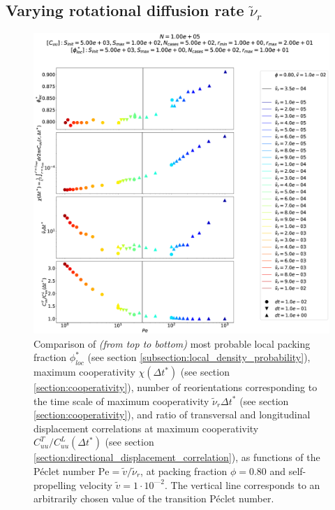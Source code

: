 \documentclass[class=report, float=false, crop=false]{standalone}
\begin{document}
\subsection{Varying rotational diffusion rate $\tilde{\nu}_r$}
\vfill
\begin{figure}[h!]
\centering
\includegraphics[width=\textwidth]{figures/figs/comparison_Dk8000_Vj1000_drdt.eps}
\caption{Comparison of \textit{(from top to bottom)} most probable local packing fraction $\phi_{loc}^*$ (see section \ref{subsection:local_density_probability}), maximum cooperativity $\chi(\Delta t^*)$ (see section \ref{section:cooperativity}), number of reorientations corresponding to the time scale of maximum cooperativity $\tilde{\nu}_r\Delta t^*$ (see section \ref{section:cooperativity}), and ratio of transversal and longitudinal displacement correlations at maximum cooperativity $C_{uu}^T/C_{uu}^L(\Delta t^*)$ (see section \ref{section:directional_displacement_correlation}), as functions of the P\'eclet number $\text{Pe} = \tilde{v}/\tilde{\nu}_r$, at packing fraction $\phi = 0.80$ and self-propelling velocity $\tilde{v} = 1\cdot10^{—2}$. The vertical line corresponds to an arbitrarily chosen value of the transition P\'eclet number.}
\label{comparison_Dk8000_Vj1000}
\end{figure}
\vfill

\newpage
\end{document}
